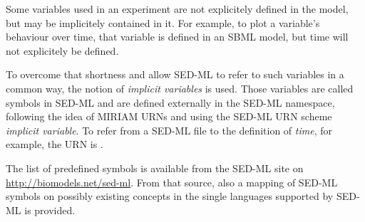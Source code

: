 \label{sec:implicitVariable}

Some variables used in an experiment are not explicitely defined in the model, but may be implicitely contained in it. 
For example, to plot a variable's behaviour over time, that variable is defined in an SBML model, but time will not explicitely be defined.

To overcome that shortness and allow SED-ML to refer to such variables in a common way, the notion of \emph{implicit variables} is used.
Those variables are called symbols in SED-ML and are defined externally in the \alert{SED-ML namespace}, following the idea of MIRIAM URNs and using the SED-ML URN scheme \emph{implicit variable}.
To refer from a SED-ML file to the definition of \emph{time}, for example, the URN is .

The list of predefined symbols is available from the SED-ML site on \url{http://biomodels.net/sed-ml}.
From that source, also a mapping of SED-ML symbols on possibly existing concepts in the single languages supported by SED-ML is provided.

